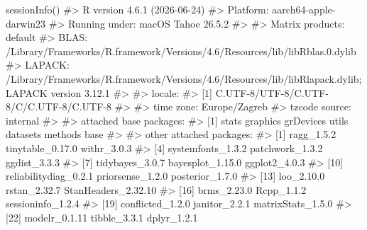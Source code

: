 \documentclass[
  italian,
  letterpaper,
  a4paper,
  11pt,
  open=any]{scrbook}
\newenvironment{Shaded}{\begin{snugshade}}{\end{snugshade}}
\newcommand{\CommentTok}[1]{\textcolor[rgb]{0.37,0.37,0.37}{#1}}
\newcommand{\FunctionTok}[1]{\textcolor[rgb]{0.28,0.35,0.67}{#1}}
\newcommand{\NormalTok}[1]{\textcolor[rgb]{0.00,0.23,0.31}{#1}}
\theoremstyle{plain}
\theoremstyle{definition}
\theoremstyle{definition}
\theoremstyle{remark}
\begin{document}
\begin{tcolorbox}[enhanced jigsaw, arc=.35mm, bottomrule=.15mm, bottomtitle=1mm, breakable, colback=white, colbacktitle=quarto-callout-note-color!10!white, colframe=quarto-callout-note-color-frame, coltitle=black, left=2mm, leftrule=.75mm, opacityback=0, opacitybacktitle=0.6, rightrule=.15mm, title=\textcolor{quarto-callout-note-color}{\faInfo}\hspace{0.5em}{Informazioni sull'ambiente di sviluppo}, titlerule=0mm, toprule=.15mm, toptitle=1mm]

\begin{Shaded}
\begin{Highlighting}[]
\FunctionTok{sessionInfo}\NormalTok{()}
\CommentTok{\#\textgreater{} R version 4.6.1 (2026{-}06{-}24)}
\CommentTok{\#\textgreater{} Platform: aarch64{-}apple{-}darwin23}
\CommentTok{\#\textgreater{} Running under: macOS Tahoe 26.5.2}
\CommentTok{\#\textgreater{} }
\CommentTok{\#\textgreater{} Matrix products: default}
\CommentTok{\#\textgreater{} BLAS:   /Library/Frameworks/R.framework/Versions/4.6/Resources/lib/libRblas.0.dylib }
\CommentTok{\#\textgreater{} LAPACK: /Library/Frameworks/R.framework/Versions/4.6/Resources/lib/libRlapack.dylib;  LAPACK version 3.12.1}
\CommentTok{\#\textgreater{} }
\CommentTok{\#\textgreater{} locale:}
\CommentTok{\#\textgreater{} [1] C.UTF{-}8/UTF{-}8/C.UTF{-}8/C/C.UTF{-}8/C.UTF{-}8}
\CommentTok{\#\textgreater{} }
\CommentTok{\#\textgreater{} time zone: Europe/Zagreb}
\CommentTok{\#\textgreater{} tzcode source: internal}
\CommentTok{\#\textgreater{} }
\CommentTok{\#\textgreater{} attached base packages:}
\CommentTok{\#\textgreater{} [1] stats     graphics  grDevices utils     datasets  methods   base     }
\CommentTok{\#\textgreater{} }
\CommentTok{\#\textgreater{} other attached packages:}
\CommentTok{\#\textgreater{}  [1] ragg\_1.5.2            tinytable\_0.17.0      withr\_3.0.3          }
\CommentTok{\#\textgreater{}  [4] systemfonts\_1.3.2     patchwork\_1.3.2       ggdist\_3.3.3         }
\CommentTok{\#\textgreater{}  [7] tidybayes\_3.0.7       bayesplot\_1.15.0      ggplot2\_4.0.3        }
\CommentTok{\#\textgreater{} [10] reliabilitydiag\_0.2.1 priorsense\_1.2.0      posterior\_1.7.0      }
\CommentTok{\#\textgreater{} [13] loo\_2.10.0            rstan\_2.32.7          StanHeaders\_2.32.10  }
\CommentTok{\#\textgreater{} [16] brms\_2.23.0           Rcpp\_1.1.2            sessioninfo\_1.2.4    }
\CommentTok{\#\textgreater{} [19] conflicted\_1.2.0      janitor\_2.2.1         matrixStats\_1.5.0    }
\CommentTok{\#\textgreater{} [22] modelr\_0.1.11         tibble\_3.3.1          dplyr\_1.2.1          }

\end{Highlighting}
\end{Shaded}
\end{tcolorbox}
\end{document}

